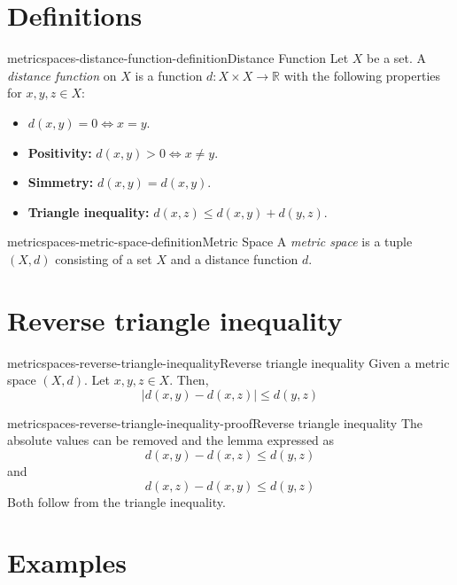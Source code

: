 \documentclass[preview]{standalone}
\begin{document}
\genpage

\section{Definitions}

\begin{snippetdefinition}{metricspaces-distance-function-definition}{Distance Function}
    Let \(X\) be a set.
    A \textit{distance function} on \(X\) is
    a function \(d: X \times X \to \mathbb{R}\)
    with the following properties for \(x,y,z \in X\):
    \begin{itemize}
        \item \(d(x,y) = 0 \iff x = y\).
        \item \textbf{Positivity:} \(d(x,y) > 0 \iff x \neq y\).
        \item \textbf{Simmetry:} \(d(x,y) = d(x,y)\).
        \item \textbf{Triangle inequality:} \(d(x,z) \leq d(x,y) + d(y,z)\).
    \end{itemize}
\end{snippetdefinition}

\begin{snippetdefinition}{metricspaces-metric-space-definition}{Metric Space}
    A \textit{metric space} is a tuple \((X, d)\)
    consisting of a set \(X\) and a distance function \(d\). %
\end{snippetdefinition}

\section{Reverse triangle inequality}

\begin{snippetlemma}{metricspaces-reverse-triangle-inequality}{Reverse triangle inequality}
    Given a metric space \((X,d)\). Let \(x,y,z \in X\).
    Then, \[|d(x,y) - d(x,z)| \leq d(y,z)\]
\end{snippetlemma}

\begin{snippetproof}{metricspaces-reverse-triangle-inequality-proof}{Reverse triangle inequality}
    The absolute values can be removed and the lemma expressed as
    \[
        d(x,y) - d(x,z) \leq d(y,z)
    \]
    and
    \[
        d(x,z) - d(x,y) \leq d(y,z)
    \]
    Both follow from the triangle inequality.
\end{snippetproof}

\section{Examples}
\end{document}
